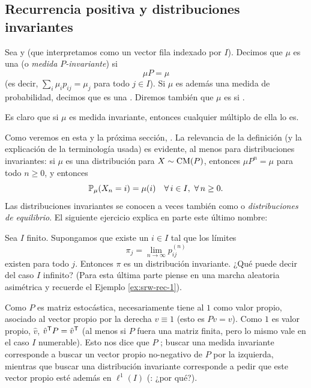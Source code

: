 \subsection{Recurrencia positiva y distribuciones invariantes}

\begin{defn}
Sea  y  (que interpretamos como un vector fila indexado por $I$).
Decimos que $\mu$ es una \emph{} (o \emph{medida $P$-invariante}) si
\[\mu P=\mu\]
(es decir, $\sum_i\mu_{i}p_{ij}=\mu_j$ para todo $j\in I$).
Si $\mu$ es además una medida de probabilidad, decimos que es una \emph{}.
Diremos también que $\mu$ es  si .
\end{defn}

Es claro que si $\mu$ es medida invariante, entonces cualquier múltiplo de ella lo es.

Como veremos en esta y la próxima sección, .
La relevancia de la definición (y la explicación de la terminología usada) es evidente, al menos para distribuciones invariantes: si $\mu$ es una distribución para $X\sim\text{\upshape{CM}}(P)$, entonces $\mu P^n=\mu$ para todo $n\geq0$, y entonces
\[\mathbb{P}_\mu(X_n=i)=\mu(i)\quad\forall\,i\in I,~\forall\,n\geq0.\]
Las distribuciones invariantes se conocen a veces también como \emph{} o \emph{distribuciones de equilibrio}.
El siguiente ejercicio explica en parte este último nombre:

\begin{exer}\label{exer:pijnf}
Sea $I$ finito.
Supongamos que existe un $i\in I$ tal que los límites
\[\pi_j=\lim_{n\to\infty}p^{(n)}_{ij}\]
existen para todo $j$.
Entonces $\pi$ es un distribución invariante.
¿Qué puede decir del caso $I$ infinito? 
(Para esta última parte piense en una marcha aleatoria asimétrica y recuerde el Ejemplo \ref{ex:srw-rec-1}).
\end{exer}

\begin{rem}
Como $P$ es matriz estocástica, necesariamente tiene al $1$ como valor propio, asociado al vector propio por la derecha $v\equiv1$ (esto es $Pv=v$).
Como $1$ es valor propio,  $\hat v$, $\hat v^{\sf T}P=\hat v^{\sf T}$ (al menos si $P$ fuera una matriz finita, pero lo mismo vale en el caso $I$ numerable).
Esto nos dice que $P$ ; buscar una medida invariante corresponde a buscar un vector propio no-negativo de $P$ por la izquierda, mientras que buscar una distribución invariante corresponde a pedir que este vector propio esté además en $\ell^1(I)$ (\uexers: ¿por qué?).
\end{rem}

